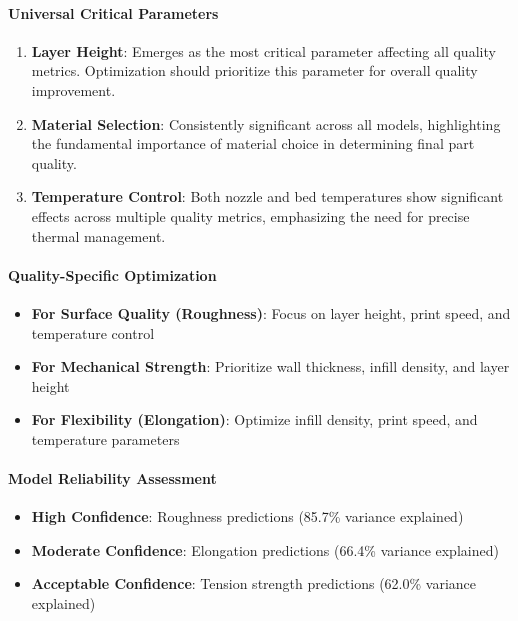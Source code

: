 \paragraph{Universal Critical Parameters}
\begin{enumerate}
    \item \textbf{Layer Height}: Emerges as the most critical parameter affecting all quality metrics. Optimization should prioritize this parameter for overall quality improvement.
    \item \textbf{Material Selection}: Consistently significant across all models, highlighting the fundamental importance of material choice in determining final part quality.
    \item \textbf{Temperature Control}: Both nozzle and bed temperatures show significant effects across multiple quality metrics, emphasizing the need for precise thermal management.
\end{enumerate}

\paragraph{Quality-Specific Optimization}
\begin{itemize}
    \item \textbf{For Surface Quality (Roughness)}: Focus on layer height, print speed, and temperature control
    \item \textbf{For Mechanical Strength}: Prioritize wall thickness, infill density, and layer height
    \item \textbf{For Flexibility (Elongation)}: Optimize infill density, print speed, and temperature parameters
\end{itemize}

\paragraph{Model Reliability Assessment}
\begin{itemize}
    \item \textbf{High Confidence}: Roughness predictions (85.7\% variance explained)
    \item \textbf{Moderate Confidence}: Elongation predictions (66.4\% variance explained)
    \item \textbf{Acceptable Confidence}: Tension strength predictions (62.0\% variance explained)
\end{itemize}

